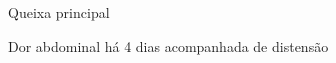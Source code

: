 \begin{frame}{Queixa principal}
\begin{block}{}
Dor abdominal há 4 dias acompanhada de distensão
\end{block}
\end{frame}